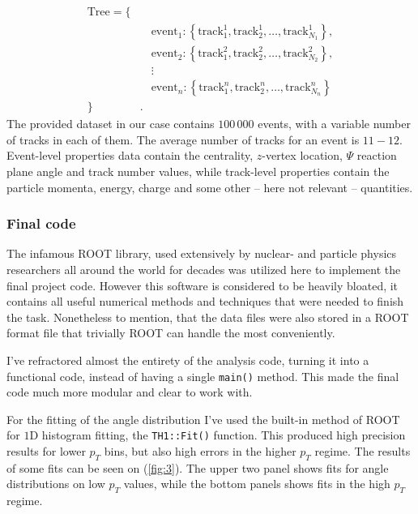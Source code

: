 \begin{align*}
	\mathrm{Tree}
	=
	\big\{& \\
	&\quad \text{event}_{1} :
		\left\{ \text{track}_{1}^{1}, \text{track}_{2}^{1}, \dots, \text{track}_{N_{1}}^{1} \right\},\\
	&\quad \text{event}_{2} :
		\left\{ \text{track}_{1}^{2}, \text{track}_{2}^{2}, \dots, \text{track}_{N_{2}}^{2} \right\},\\
	&\quad \vdots \\
	&\quad \text{event}_{n} :
		\left\{ \text{track}_{1}^{n}, \text{track}_{2}^{n}, \dots, \text{track}_{N_{n}}^{n} \right\}\\
	\big\}&.
\end{align*}
The provided dataset in our case contains $100\,000$ events, with a variable number of tracks in each of them. The average number of tracks for an event is $11-12$. Event-level properties data contain the centrality, $z$-vertex location, $\Psi$ reaction plane angle and track number values, while track-level properties contain the particle momenta, energy, charge and some other -- here not relevant -- quantities.

\subsubsection{Final code}
The infamous ROOT library, used extensively by nuclear- and particle physics researchers all around the world for decades was utilized here to implement the final project code. However this software is considered to be heavily bloated, it contains all useful numerical methods and techniques that were needed to finish the task. Nonetheless to mention, that the data files were also stored in a ROOT format file that trivially ROOT can handle the most conveniently.

I've refractored almost the entirety of the analysis code, turning it into a functional code, instead of having a single \texttt{main()} method. This made the final code much more modular and clear to work with.

For the fitting of the angle distribution I've used the built-in method of ROOT for $1$D histogram fitting, the \texttt{TH1::Fit()} function. This produced high precision results for lower $p_{T}$ bins, but also high errors in the higher $p_{T}$ regime. The results of some fits can be seen on (\ref{fig:3}). The upper two panel shows fits for angle distributions on low $p_{T}$ values, while the bottom panels shows fits in the high $p_{T}$ regime.

